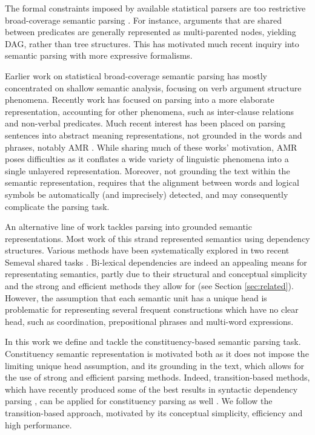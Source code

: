 \documentclass[11pt]{article}
\newcommand{\secref}[1]{Section \ref{#1}}
\begin{document}
The formal constraints imposed by available statistical parsers are too restrictive
broad-coverage semantic parsing \cite{oepen2015semeval}.
For instance, arguments that are shared
between predicates are generally represented as multi-parented nodes,
yielding DAG, rather than tree structures. This has motivated much recent
inquiry into semantic parsing with more expressive formalisms.

Earlier work on statistical broad-coverage semantic parsing has mostly
concentrated on shallow semantic analysis, focusing on verb argument structure phenomena.
Recently work has focused on parsing into a more elaborate representation, accounting
for other phenomena, such as inter-clause relations and non-verbal predicates.
Much recent interest has been placed on parsing sentences into abstract meaning representations,
not grounded in the words and phrases, notably AMR \cite{banarescu2013abstract}.
While sharing much of these works' motivation, AMR poses difficulties as it conflates
a wide variety of linguistic phenomena into a single unlayered representation.
Moreover, not grounding the text within the semantic representation,
requires that the alignment between words and logical symbols be automatically
(and imprecisely) detected, and may consequently complicate the parsing task.

An alternative line of work tackles parsing into grounded semantic representations.
Most work of this strand represented semantics using dependency structures.
Various methods have been systematically explored
in two recent Semeval shared tasks \cite{oepen2014semeval,oepen2015semeval}.
Bi-lexical dependencies are indeed an appealing means for representating semantics, partly due to
their structural and conceptual simplicity and the strong and efficient
methods they allow for (see \secref{sec:related}).
However, the assumption that each semantic unit has a unique head is
problematic for representing several frequent constructions which have no clear
head, such as coordination, prepositional phrases and multi-word expressions.

In this work we define and tackle the constituency-based semantic parsing task.
Constituency semantic representation is motivated both as it does not
impose the limiting unique head assumption, and its grounding in the text,
which allows for the use of strong and efficient parsing methods.
Indeed, transition-based methods, which have recently produced some of the best
results in syntactic dependency parsing \cite{dyer2015transition,ballesteros2015improved},
can be applied
for constituency parsing as well \cite{sagae2008shift,zhu2013fast,maier2015discontinuous}. 
We follow the transition-based approach, motivated by its conceptual simplicity,
efficiency and high performance.
\end{document}
